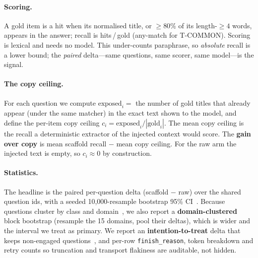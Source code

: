 \documentclass[11pt]{article}
\begin{document}
\paragraph{Scoring.}
A gold item is a hit when its normalised title, or $\geq 80\%$ of its length-$\geq 4$ words,
appears in the answer; recall is hits\,/\,gold (any-match for T-COMMON). Scoring is lexical and
needs no model. This under-counts paraphrase, so \emph{absolute} recall is a lower bound; the
\emph{paired} delta---same questions, same scorer, same model---is the signal.

\paragraph{The copy ceiling.}
For each question we compute $\mathrm{exposed}_i = $ the number of gold titles that already appear
(under the same matcher) in the exact text shown to the model, and define the per-item copy
ceiling $c_i = \mathrm{exposed}_i / |\text{gold}_i|$. The mean copy ceiling is the recall a
deterministic extractor of the injected context would score. The \textbf{gain over copy} is
mean scaffold recall $-$ mean copy ceiling. For the raw arm the injected text is empty, so
$c_i\approx 0$ by construction.

\paragraph{Statistics.}
The headline is the paired per-question delta (scaffold $-$ raw) over the shared question ids,
with a seeded 10{,}000-resample bootstrap 95\% CI~\cite{efron1979bootstrap,koehn2004significance}.
Because questions cluster by class and domain~\cite{dror2018hitchhiker}, we also report a
\textbf{domain-clustered} block bootstrap (resample the 15 domains, pool their deltas), which is
wider and the interval we treat as primary. We report an \textbf{intention-to-treat} delta that
keeps non-engaged questions~\cite{hollis1999itt}, and per-row \texttt{finish\_reason}, token
breakdown and retry counts so truncation and transport flakiness are auditable, not hidden.
\end{document}
